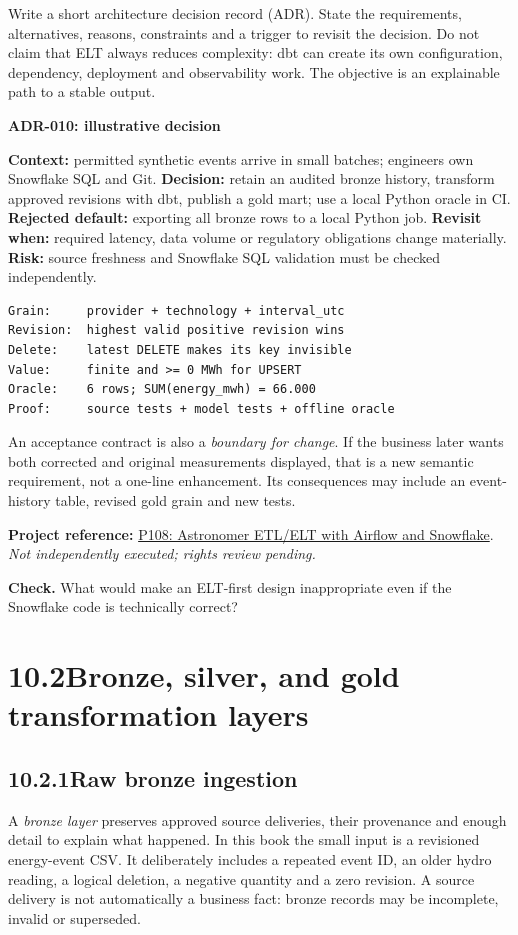 \documentclass[11pt,twoside]{article}
\newcommand{\topic}[2]{\subsection*{#1\quad #2}}
\newcommand{\repo}[2]{\par\begingroup\fontsize{8.0}{9.6}\selectfont\sffamily\color{inkgray}\textbf{Project reference:} \href{#2}{#1}. \textit{Not independently executed; rights review pending.}\par\endgroup}
\begin{document}
Write a short architecture decision record (ADR). State the requirements, alternatives, reasons, constraints and a trigger to revisit the decision. Do not claim that ELT always reduces complexity: dbt can create its own configuration, dependency, deployment and observability work. The objective is an explainable path to a stable output.
\begin{whitebox}\textbf{ADR-010: illustrative decision}\par
\textbf{Context:} permitted synthetic events arrive in small batches; engineers own Snowflake SQL and Git. \textbf{Decision:} retain an audited bronze history, transform approved revisions with dbt, publish a gold mart; use a local Python oracle in CI. \textbf{Rejected default:} exporting all bronze rows to a local Python job. \textbf{Revisit when:} required latency, data volume or regulatory obligations change materially. \textbf{Risk:} source freshness and Snowflake SQL validation must be checked independently.\end{whitebox}
\begin{lstlisting}[caption={A concise acceptance contract for the running example.}]
Grain:     provider + technology + interval_utc
Revision:  highest valid positive revision wins
Delete:    latest DELETE makes its key invisible
Value:     finite and >= 0 MWh for UPSERT
Oracle:    6 rows; SUM(energy_mwh) = 66.000
Proof:     source tests + model tests + offline oracle
\end{lstlisting}
An acceptance contract is also a \emph{boundary for change}. If the business later wants both corrected and original measurements displayed, that is a new semantic requirement, not a one-line enhancement. Its consequences may include an event-history table, revised gold grain and new tests.
\repo{P108: Astronomer ETL/ELT with Airflow and Snowflake}{https://github.com/astronomer/etl-elt-airflow-snowflake}
\textbf{Check.} What would make an ELT-first design inappropriate even if the Snowflake code is technically correct?
\newpage
\section*{10.2\quad Bronze, silver, and gold transformation layers}
\topic{10.2.1}{Raw bronze ingestion}
A \emph{bronze layer} preserves approved source deliveries, their provenance and enough detail to explain what happened. In this book the small input is a revisioned energy-event CSV. It deliberately includes a repeated event ID, an older hydro reading, a logical deletion, a negative quantity and a zero revision. A source delivery is not automatically a business fact: bronze records may be incomplete, invalid or superseded.
\end{document}

